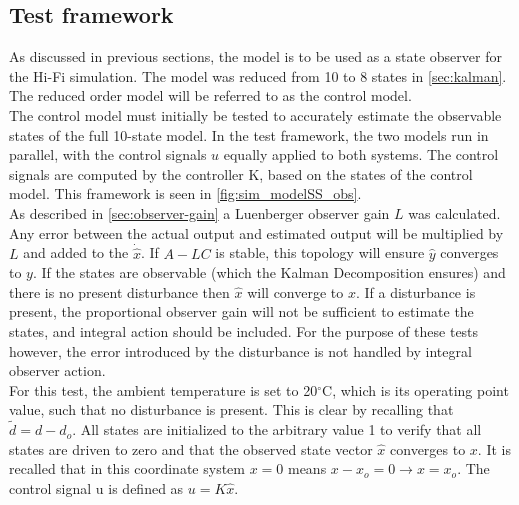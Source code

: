 \subsection{Test framework}
As discussed in previous sections, the model is to be used as a state observer for the Hi-Fi simulation. The model was reduced from 10 to 8 states in \cref{sec:kalman}. The reduced order model will be referred to as the control model. \\

\noindent The control model must initially be tested to accurately estimate the observable states of the full 10-state model. In the test framework, the two models run in parallel, with the control signals $u$ equally applied to both systems. The control signals are computed by the controller K, based on the states of the control model. This framework is seen in \cref{fig:sim_modelSS_obs}. \\

\noindent As described in \cref{sec:observer-gain} a Luenberger observer gain $L$ was calculated. Any error between the actual output and estimated output will be multiplied by $L$ and added to the $\dot{\hat{x}}$. If $A-LC$ is stable, this topology will ensure $\hat{y}$ converges to $y$. If the states are observable (which the Kalman Decomposition ensures) and there is no present disturbance then $\hat{x}$ will converge to $x$. If a disturbance is present, the proportional observer gain will not be sufficient to estimate the states, and integral action should be included. For the purpose of these tests however, the error introduced by the disturbance is not handled by integral observer action. \\

\noindent For this test, the ambient temperature is set to 20$^{\circ}$C, which is its operating point value, such that no disturbance is present. This is clear by recalling that $\tilde{d} = d-d_o$. All states are initialized to the arbitrary value 1 to verify that all states are driven to zero and that the observed state vector $\hat{x}$ converges to $x$. It is recalled that in this coordinate system $x=0$ means $x-x_o = 0 \rightarrow x=x_o$. The control signal u is defined as $u=K\hat{x}$.

